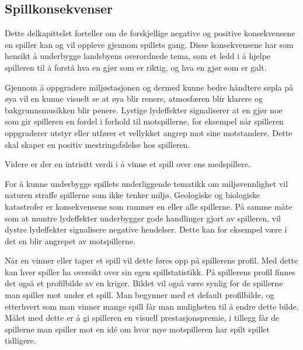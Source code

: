\subsection{Spillkonsekvenser}
Dette delkapittelet forteller om de forskjellige negative og positive
konsekvensene en spiller kan og vil oppleve gjennom spillets gang. Disse konsekvensene har som hensikt å underbygge landsbyens overordnede tema, som et ledd i å hjelpe spilleren til å forstå hva en gjør som er riktig, og hva en gjør som er galt.

Gjennom å oppgradere miljøstasjonen og dermed kunne bedre håndtere søpla på øya vil en kunne visuelt se at øya blir renere, atmosfæren blir klarere og bakgrunnsmusikken blir penere. Lystige lydeffekter signaliserer at en gjør noe som gir spilleren en fordel i forhold til motspillerne, for eksempel når spilleren oppgraderer utstyr eller utfører et vellykket angrep mot sine
motstandere. Dette skal skaper en positiv mestringsfølelse hos spilleren. 

Videre er der en intrisitt verdi i å vinne et spill over ens
medspillere.

For å kunne underbygge spillets underliggende tematikk om
miljøvennlighet vil naturen straffe spillerne som ikke tenker miljø.
Geologiske og biologiske katastrofer er konsekvensene som rammer en
eller alle spillerne.
På samme måte som at muntre lydeffekter underbygger gode handlinger
gjort av spilleren, vil dystre lydeffekter signalisere negative
hendelser. Dette kan for eksempel være i det en blir angrepet av
motspillerne. 

Når en vinner eller taper et spill vil dette føres opp på spillerens
profil. Med dette kan hver spiller ha oversikt over sin egen
spillstatistikk. På spillerens profil finnes det også et profilbilde av
en kriger. Bildet vil også være synlig for de spillerne man spiller mot
under et spill. Man begynner med et default profilbilde, og etterhvert
som man vinner mange spill får man muligheten til å endre dette bilde.
Målet med dette er å gi spilleren en visuell prestasjonspremie, i
tillegg får de spillerne man spiller mot en idé om hvor mye motspilleren
har spilt spillet tidligere.




